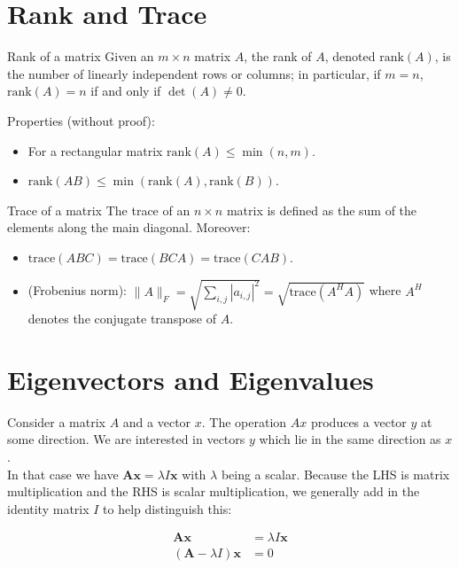\section{Rank and Trace}

\begin{definitionbox}{Rank of a matrix}
Given an \( m \times n \) matrix \( A \), the rank of \( A \), denoted \( \text{rank}(A) \), is the number of linearly independent rows or columns; in particular, if \( m = n \), \( \text{rank}(A) = n \) if and only if \( \det(A) \neq 0 \).

Properties (without proof):
\begin{itemize}
    \item For a rectangular matrix \( \text{rank}(A) \leq \min(n, m) \).
    \item \( \text{rank}(AB) \leq \min(\text{rank}(A), \text{rank}(B)) \).
\end{itemize}
\end{definitionbox}

\begin{definitionbox}{Trace of a matrix}
The trace of an \( n \times n \) matrix is defined as the sum of the elements along the main diagonal. Moreover:
\begin{itemize}
    \item \( \text{trace}(ABC) = \text{trace}(BCA) = \text{trace}(CAB) \).
    \item (Frobenius norm): \( \|A\|_F = \sqrt{\sum_{i,j} |a_{i,j}|^2} = \sqrt{\text{trace}(A^HA)} \) where \( A^H \) denotes the conjugate transpose of \( A \).
\end{itemize}
\end{definitionbox}


\section{Eigenvectors and Eigenvalues}
Consider a matrix \( A \) and a vector \( x \). The operation \( Ax \) produces a vector \( y \) at some direction. We are interested in vectors \( y \) which lie in the same direction as \( x \).\\    

In that case we have \( \textbf{Ax} = \lambda I \textbf{x} \) with \( \lambda \) being a scalar. Because the LHS is matrix multiplication and the RHS is scalar multiplication, we generally add in the identity matrix $I$ to help distinguish this:

\begin{align*}
    \textbf{Ax} &= \lambda I\textbf{x}\\
    (\textbf{A}-\lambda I)\textbf{x} &= 0
\end{align*}

